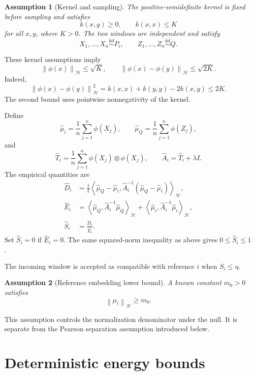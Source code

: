 \documentclass[11pt]{article}
\newcommand{\HH}{\mathcal H}
\newcommand{\inner}[2]{\left\langle #1,#2\right\rangle_{\HH}}
\newcommand{\norm}[1]{\left\lVert #1\right\rVert_{\HH}}
\newtheorem{assumption}{Assumption}
\begin{document}
\begin{assumption}[Kernel and sampling]
\label{ass:sampling}
The positive-semidefinite kernel is fixed before sampling
and satisfies
\[
k(x,y)\ge0,
\qquad
k(x,x)\le K
\]
for all $x,y$, where $K>0$.
The two windows are independent and satisfy
\[
X_1,\ldots,X_n\overset{\mathrm{iid}}{\sim}P_i,
\qquad
Z_1,\ldots,Z_n\overset{\mathrm{iid}}{\sim}Q.
\]
\end{assumption}

These kernel assumptions imply
\begin{equation}
\norm{\phi(x)}\le\sqrt K,
\qquad
\norm{\phi(x)-\phi(y)}\le\sqrt{2K}.
\label{eq:feature-bounds}
\end{equation}
Indeed,
\[
\norm{\phi(x)-\phi(y)}^2
=k(x,x)+k(y,y)-2k(x,y)\le2K.
\]
The second bound uses pointwise nonnegativity of the kernel.

Define
\[
\widehat\mu_i=\frac1n\sum_{j=1}^n\phi(X_j),
\qquad
\widehat\mu_Q=\frac1n\sum_{j=1}^n\phi(Z_j),
\]
and
\[
\widehat T_i
=\frac1n\sum_{j=1}^n\phi(X_j)\otimes\phi(X_j),
\qquad
\widehat A_i=\widehat T_i+\lambda I.
\]
The empirical quantities are
\begin{align}
\widehat D_i
&=
\frac12
\inner{\widehat\mu_Q-\widehat\mu_i}
{\widehat A_i^{-1}(\widehat\mu_Q-\widehat\mu_i)},
\\
\widehat E_i
&=
\inner{\widehat\mu_Q}
{\widehat A_i^{-1}\widehat\mu_Q}
+
\inner{\widehat\mu_i}
{\widehat A_i^{-1}\widehat\mu_i},
\\
\widehat S_i
&=\frac{\widehat D_i}{\widehat E_i}.
\end{align}
Set $\widehat S_i=0$ if $\widehat E_i=0$.
The same squared-norm inequality as above gives
$0\le\widehat S_i\le1$.

The incoming window is accepted as compatible with reference
$i$ when $\widehat S_i\le\eta$.

\begin{assumption}[Reference embedding lower bound]
\label{ass:energy}
A known constant $m_0>0$ satisfies
\[
\norm{\mu_i}\ge m_0.
\]
\end{assumption}

This assumption controls the normalization denominator
under the null. It is separate from the Pearson separation
assumption introduced below.

\section{Deterministic energy bounds}
\end{document}

